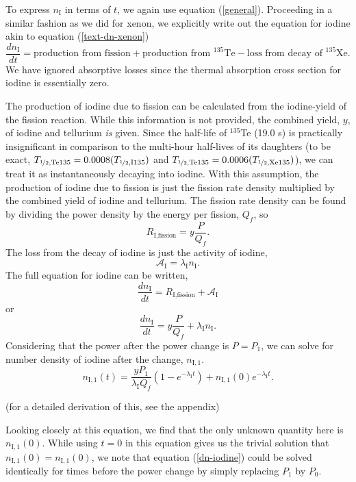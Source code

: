 \documentclass{report}
\begin{document}
To express $n_{\text{I}}$ in terms of $t$, we again use equation (\ref{general}). Proceeding in a similar fashion as we did for xenon, we explicitly write out the equation for iodine akin to equation (\ref{text-dn-xenon})
\begin{equation}
\label{text-dn-iodine}
\frac{dn_{\text{I}}}{dt} = \text{production from fission} + \text{production from }^{135}\text{Te} - \text{loss from decay of }^{135}\text{Xe}.
\end{equation}
We have ignored absorptive losses since the thermal absorption cross section for iodine is essentially zero. 

The production of iodine due to fission can be calculated from the iodine-yield of the fission reaction. While this information is not provided, the combined yield, $y$, of iodine and tellurium \textit{is} given. Since the half-life of $^{135}$Te (19.0 s) is practically insignificant in comparison to the multi-hour half-lives of its daughters (to be exact, $T_{\nicefrac{1}{2},\text{Te135}} = 0.0008(T_{\nicefrac{1}{2},\text{I135}})$ and $T_{\nicefrac{1}{2},\text{Te135}} = 0.0006(T_{\nicefrac{1}{2},\text{Xe135}})$), we can treat it as instantaneously decaying into iodine. With this assumption, the production of iodine due to fission is just the fission rate density multiplied by the combined yield of iodine and tellurium. The fission rate density can be found by dividing the power density by the energy per fission, $Q_f$, so
$$ R_{\text{I,fission}} = y\frac{P}{Q_f} .$$
The loss from the decay of iodine is just the activity of iodine,
$$ \mathcal{A}_{\text{I}} = \lambda_{\text{I}}n_{\text{I}}. $$
The full equation for iodine can be written,
$$ \frac{dn_{\text{I}}}{dt} = R_{\text{I,fission}} + \mathcal{A}_{\text{I}} $$
or 
\begin{equation}
\label{dn-iodine}
\frac{dn_{\text{I}}}{dt} = y\frac{P}{Q_f} + \lambda_{\text{I}}n_{\text{I}} .
\end{equation}
Considering that the power after the power change is $P=P_1$, we can solve for number density of iodine after the change, $n_{\text{I},1}$.
\begin{equation}
\label{n-iodine1}
n_{\text{I},1}(t) = \frac{y P_1}{\lambda_{\text{I}}Q_f}\left(1-e^{-\lambda_{\text{I}}t}\right) + n_{\text{I},1}(0)e^{-\lambda_{\text{I}}t}.
\end{equation}
\begin{center}(for a detailed derivation of this, see the appendix)\end{center}
Looking closely at this equation, we find that the only unknown quantity here is $n_{\text{I},1}(0)$. While using $t=0$ in this equation gives us the trivial solution that $n_{\text{I},1}(0) = n_{\text{I},1}(0)$, we note that equation (\ref{dn-iodine}) could be solved identically for times before the power change by simply replacing $P_1$ by $P_0$. 
\end{document}
